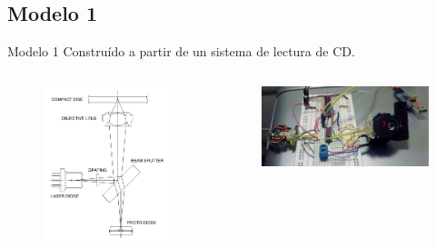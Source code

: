 \documentclass{beamer}
\begin{document}
    \subsection{Modelo 1}
    \begin{frame}{Modelo 1}
    	Construído a partir de un sistema de lectura de CD.
    	\begin{columns}
	    		\begin{figure}[h]
	    			\includegraphics[width=0.9\linewidth]{figures/cdsystem.png}
	    		\end{figure}
		    	\begin{figure}
		    	\includegraphics[width=0.9\linewidth]{figures/breadboard}
		    	\end{figure}
    	\end{columns}
    \end{frame}
\end{document}
